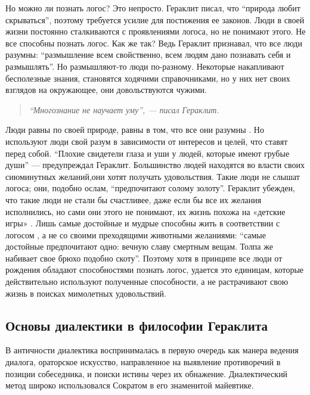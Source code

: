 \documentclass[
]{article}
\begin{document}
Но можно ли познать логос? Это непросто. Гераклит писал, что ``природа
любит скрываться'', поэтому требуется усилие для постижения ее законов.
Люди в своей жизни постоянно сталкиваются с проявлениями логоса, но не
понимают этого. Не все способны познать логос. Как же так? Ведь Гераклит
признавал, что все люди разумны: ``размышление всем свойственно, всем
людям дано познавать себя и размышлять''. Но размышляют-то люди
по-разному. Некоторые накапливают бесполезные знания, становятся
ходячими справочниками, но у них нет своих взглядов на окружающее, они
довольствуются чужими.

\begin{quote}
\emph{``Многознание не научает уму'', --- писал Гераклит.}
\end{quote}

Люди равны по своей природе, равны в том, что все они разумны . Но
используют люди свой разум в зависимости от интересов и целей, что
ставят перед собой. ``Плохие свидетели глаза и уши у людей, которые
имеют грубые души'' --- предупреждал Гераклит. Большинство людей
находятся во власти своих сиюминутных желаний,они хотят получать
удовольствия. Такие люди не слышат логоса; они, подобно ослам,
``предпочитают солому золоту''. Гераклит убежден, что такие люди не
стали бы счастливее, даже если бы все их желания исполнились, но сами
они этого не понимают, их жизнь похожа на «детские игры» . Лишь самые
достойные и мудрые способны жить в соответствии с логосом , а не со
своими преходящими животными желаниями: ``самые достойные предпочитают
одно: вечную славу смертным вещам. Толпа же набивает свое брюхо подобно
скоту''. Поэтому хотя в принципе все люди от рождения обладают
способностями познать логос, удается это единицам, которые действительно
используют полученные способности, а не растрачивают свою жизнь в
поисках мимолетных удовольствий.

\hypertarget{ux43eux441ux43dux43eux432ux44b-ux434ux438ux430ux43bux435ux43aux442ux438ux43aux438-ux432-ux444ux438ux43bux43eux441ux43eux444ux438ux438-ux433ux435ux440ux430ux43aux43bux438ux442ux430}{%
\subsection{Основы диалектики в философии
Гераклита}\label{ux43eux441ux43dux43eux432ux44b-ux434ux438ux430ux43bux435ux43aux442ux438ux43aux438-ux432-ux444ux438ux43bux43eux441ux43eux444ux438ux438-ux433ux435ux440ux430ux43aux43bux438ux442ux430}}

В античности диалектика воспринималась в первую очередь как манера
ведения диалога, ораторское искусство, направленное на выявление
противоречий в позиции собеседника, и поиски истины через их обнажение.
Диалектический метод широко использовался Сократом в его знаменитой
майевтике.
\end{document}
